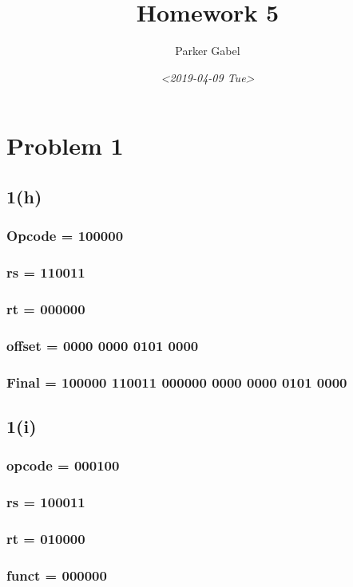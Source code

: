 \documentclass[11pt]{article}
\author{Parker Gabel}
\date{\textit{<2019-04-09 Tue>}}
\title{Homework 5}
\begin{document}
\maketitle
\section{Problem 1}
\label{sec:orgb538111}
\subsection{1(h)}
\label{sec:org738061f}
\subsubsection{Opcode = 100000}
\label{sec:org56a81e2}
\subsubsection{rs = 110011}
\label{sec:orgb4c45de}
\subsubsection{rt = 000000}
\label{sec:org1d33957}
\subsubsection{offset = 0000 0000 0101 0000}
\label{sec:org7abb3dc}
\subsubsection{Final = 100000 110011 000000 0000 0000 0101 0000}
\label{sec:orgc1beabe}
\subsection{1(i)}
\label{sec:orgfa8fab9}
\subsubsection{opcode = 000100}
\label{sec:org5d17ce9}
\subsubsection{rs = 100011}
\label{sec:org27fad6d}
\subsubsection{rt = 010000}
\label{sec:org44d9e13}
\subsubsection{funct = 000000}
\label{sec:org054deac}
\end{document}
